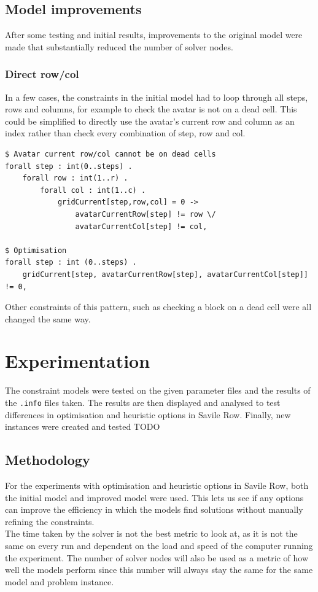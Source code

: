 \documentclass{article}
\newcommand{\n}[0]{\\[\baselineskip]}
\begin{document}
\subsection{Model improvements}
After some testing and initial results, improvements to the original model were made that substantially reduced the number of solver nodes. 
\subsubsection{Direct row/col}
In a few cases, the constraints in the initial model had to loop through all steps, rows and columns, for example to check the avatar is not on a dead cell. This could be simplified to directly use the avatar's current row and column as an index rather than check every combination of step, row and col.
\begin{lstlisting}[caption={Example of optimising number of constraints by directly indexing with \texttt{avatarCurrentRow} and \texttt{avatarCurrentCol}.}, captionpos=b]
$ Avatar current row/col cannot be on dead cells
forall step : int(0..steps) .
    forall row : int(1..r) .
        forall col : int(1..c) .
	    	gridCurrent[step,row,col] = 0 -> 
	    		avatarCurrentRow[step] != row \/ 
	    		avatarCurrentCol[step] != col,

$ Optimisation
forall step : int (0..steps) .
    gridCurrent[step, avatarCurrentRow[step], avatarCurrentCol[step]] != 0,
\end{lstlisting}
Other constraints of this pattern, such as checking a block on a dead cell were all changed the same way.

\section{Experimentation}
The constraint models were tested on the given parameter files and the results of the \texttt{.info} files taken. The results are then displayed and analysed to test differences in optimisation and heuristic options in Savile Row. Finally, new instances were created and tested TODO


\subsection{Methodology}

For the experiments with optimisation and heuristic options in Savile Row, both the initial model and improved model were used. This lets us see if any options can improve the efficiency in which the models find solutions without manually refining the constraints. 
\n
The time taken by the solver is not the best metric to look at, as it is not the same on every run and dependent on the load and speed of the computer running the experiment. The number of solver nodes will also be used as a metric of how well the models perform since this number will always stay the same for the same model and problem instance. 
\end{document}
